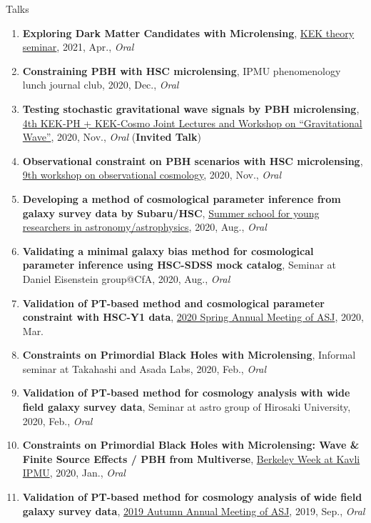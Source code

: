 \begin{rSection}{Talks}
\begin{enumerate}[itemsep=0pt, parsep=0pt, topsep=0pt, partopsep=0pt]
\item \textbf{Exploring Dark Matter Candidates with Microlensing}, \href{https://www.kek.jp/ja/conference/20210407-3/}{KEK theory seminar}, 2021, Apr., \textit{Oral}
\item \textbf{Constraining PBH with HSC microlensing}, IPMU phenomenology lunch journal club, 2020, Dec., \textit{Oral}
\item \textbf{Testing stochastic gravitational wave signals by PBH microlensing}, \href{http://conference-indico.kek.jp/event/117/timetable/#day-2020-11-04}{4th KEK-PH + KEK-Cosmo Joint Lectures and Workshop on ``Gravitational Wave''}, 2020, Nov., \textit{Oral} (\textbf{Invited Talk})
\item \textbf{Observational constraint on PBH scenarios with HSC microlensing}, \href{https://indico.ipmu.jp/event/382/timetable/#all}{9th workshop on observational cosmology}, 2020, Nov., \textit{Oral}
\item \textbf{Developing a method of cosmological parameter inference from galaxy survey data by Subaru/HSC}, \href{http://www.astro-wakate.org/ss2019/web/}{Summer school for young researchers in astronomy/astrophysics}, 2020, Aug., \textit{Oral}
\item \textbf{Validating a minimal galaxy bias method for cosmological parameter inference using HSC-SDSS mock catalog}, Seminar at Daniel Eisenstein group@CfA, 2020, Aug., \textit{Oral}
\item \textbf{Validation of PT-based method and cosmological parameter constraint with HSC-Y1 data}, \href{http://www.asj.or.jp/nenkai/archive/2020a/pdf/U03a.pdf}{2020 Spring Annual Meeting of ASJ}, 2020, Mar.
\item \textbf{Constraints on Primordial Black Holes with Microlensing}, Informal seminar at Takahashi and Asada Labs, 2020, Feb., \textit{Oral}
\item \textbf{Validation of PT-based method for cosmology analysis with wide field galaxy survey data}, Seminar at astro group of Hirosaki University, 2020, Feb., \textit{Oral}
\item \textbf{Constraints on Primordial Black Holes with Microlensing: Wave \& Finite Source Effects / PBH from Multiverse}, \href{http://indico.ipmu.jp/event/313/overview}{Berkeley Week at Kavli IPMU}, 2020, Jan., \textit{Oral}
\item \textbf{Validation of PT-based method for cosmology analysis of wide field galaxy survey data}, \href{https://www.asj.or.jp/nenkai/archive/2019b/pdf/U20a.pdf}{2019 Autumn Annual Meeting of ASJ}, 2019, Sep., \textit{Oral}

\end{enumerate}
\end{rSection}

